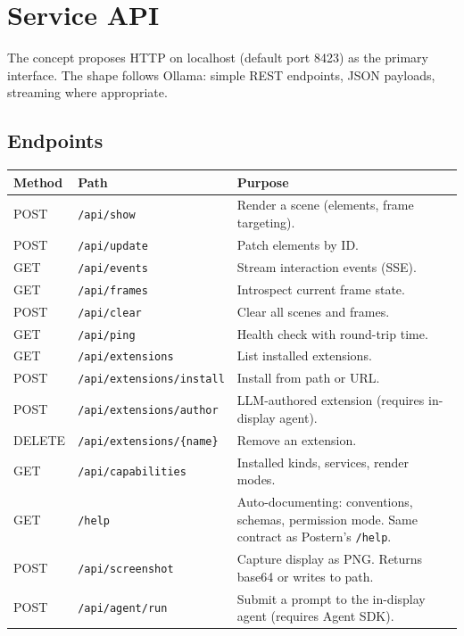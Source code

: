 \documentclass[a4paper,10pt]{article}
\newcommand{\api}[1]{\texttt{#1}}
\begin{document}
\section{Service API}

The concept proposes HTTP on localhost (default port 8423) as the
primary interface.  The shape follows Ollama: simple REST endpoints,
JSON payloads, streaming where appropriate.

\subsection{Endpoints}

\begin{center}
\begin{tabularx}{\linewidth}{@{}llX@{}}
\toprule
\textbf{Method} & \textbf{Path} & \textbf{Purpose} \\
\midrule
POST & \api{/api/show}      & Render a scene (elements, frame
  targeting). \\
POST & \api{/api/update}    & Patch elements by ID. \\
GET  & \api{/api/events}    & Stream interaction events (SSE). \\
GET  & \api{/api/frames}    & Introspect current frame state. \\
POST & \api{/api/clear}     & Clear all scenes and frames. \\
GET  & \api{/api/ping}      & Health check with round-trip time. \\
\midrule
GET  & \api{/api/extensions}          & List installed extensions. \\
POST & \api{/api/extensions/install}  & Install from path or URL. \\
POST & \api{/api/extensions/author}   & LLM-authored extension
  (requires in-display agent). \\
DELETE & \api{/api/extensions/\{name\}} & Remove an extension. \\
\midrule
GET  & \api{/api/capabilities} & Installed kinds, services,
  render modes. \\
GET  & \api{/help}           & Auto-documenting: conventions,
  schemas, permission mode.  Same contract as
  Postern's \api{/help}. \\
\midrule
POST & \api{/api/screenshot} & Capture display as PNG.  Returns
  base64 or writes to path. \\
POST & \api{/api/agent/run}  & Submit a prompt to the in-display
  agent (requires Agent SDK). \\
\bottomrule
\end{tabularx}
\end{center}
\end{document}
